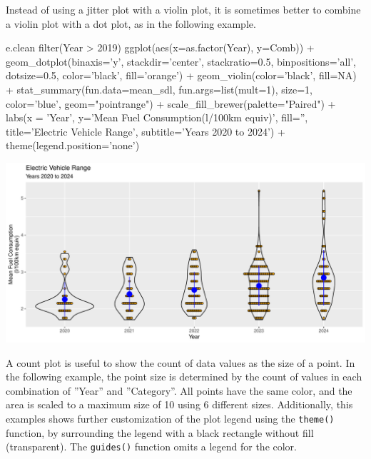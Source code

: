 Instead of using a jitter plot with a violin plot, it is sometimes better to combine a violin plot with a dot plot, as in the following example.

\begin{samepage}
\begin{Rcode}
e.clean %
  filter(Year > 2019) %
  ggplot(aes(x=as.factor(Year), y=Comb)) +
    geom_dotplot(binaxis='y', 
                 stackdir='center', stackratio=0.5,
                 binpositions='all', dotsize=0.5, 
                 color='black', fill='orange') +
    geom_violin(color='black', fill=NA) + 
    stat_summary(fun.data=mean_sdl, 
                 fun.args=list(mult=1), 
                 size=1, color='blue', 
                 geom="pointrange") +
    scale_fill_brewer(palette="Paired") +
    labs(x = 'Year', 
         y='Mean Fuel Consumption\n(l/100km equiv)', 
         fill='', 
         title='Electric Vehicle Range', 
         subtitle='Years 2020 to 2024') +
     theme(legend.position='none')
\end{Rcode}
\end{samepage}

\begin{center}
  \includegraphics[width=.8\textwidth]{fuel.dotplotjviolinsummary.pdf}
\end{center}

A count plot is useful to show the count of data values as the size of a point. In the following example, the point size is determined by the count of values in each combination of ''Year'' and ''Category''. All points have the same color, and the area is scaled to a maximum size of 10 using 6 different sizes. Additionally, this examples shows further customization of the plot legend using the \texttt{theme()} function, by surrounding the legend with a black rectangle without fill (transparent). The \texttt{guides()} function omits a legend for the color. 

